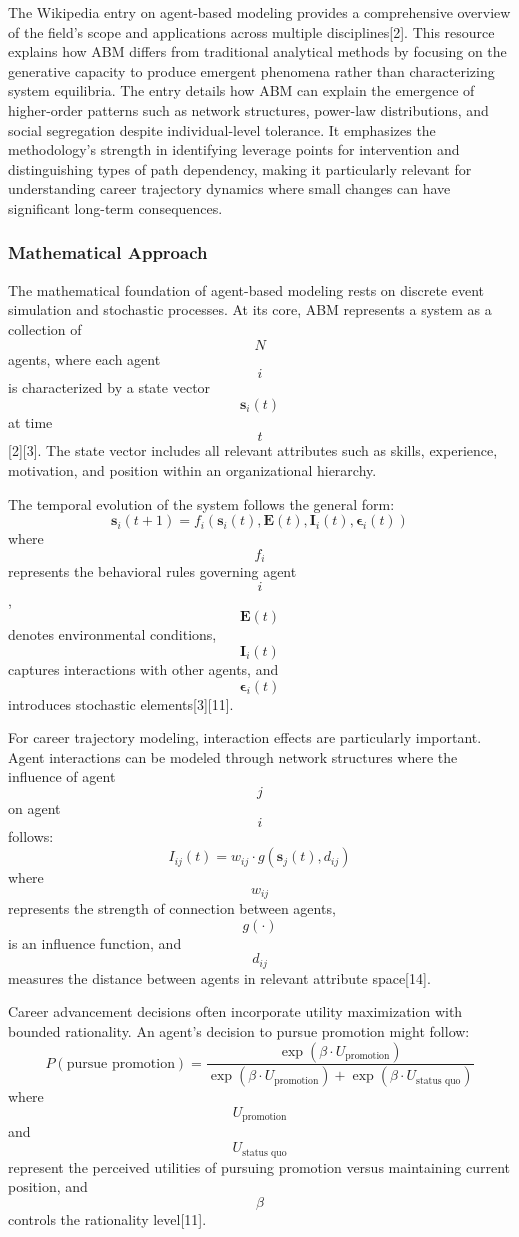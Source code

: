 \documentclass[main.tex]{subfiles}
\begin{document}
The Wikipedia entry on agent-based modeling provides a comprehensive overview of the field's scope and applications across multiple disciplines[2]. This resource explains how ABM differs from traditional analytical methods by focusing on the generative capacity to produce emergent phenomena rather than characterizing system equilibria. The entry details how ABM can explain the emergence of higher-order patterns such as network structures, power-law distributions, and social segregation despite individual-level tolerance. It emphasizes the methodology's strength in identifying leverage points for intervention and distinguishing types of path dependency, making it particularly relevant for understanding career trajectory dynamics where small changes can have significant long-term consequences.

\subsubsection{Mathematical Approach}

The mathematical foundation of agent-based modeling rests on discrete event simulation and stochastic processes. At its core, ABM represents a system as a collection of $$ N $$ agents, where each agent $$ i $$ is characterized by a state vector $$ \mathbf{s}_i(t) $$ at time $$ t $$[2][3]. The state vector includes all relevant attributes such as skills, experience, motivation, and position within an organizational hierarchy.

The temporal evolution of the system follows the general form:
$$
\mathbf{s}_i(t+1) = f_i(\mathbf{s}_i(t), \mathbf{E}(t), \mathbf{I}_i(t), \boldsymbol{\epsilon}_i(t))
$$
where $$ f_i $$ represents the behavioral rules governing agent $$ i $$, $$ \mathbf{E}(t) $$ denotes environmental conditions, $$ \mathbf{I}_i(t) $$ captures interactions with other agents, and $$ \boldsymbol{\epsilon}_i(t) $$ introduces stochastic elements[3][11].

For career trajectory modeling, interaction effects are particularly important. Agent interactions can be modeled through network structures where the influence of agent $$ j $$ on agent $$ i $$ follows:
$$
I_{ij}(t) = w_{ij} \cdot g(\mathbf{s}_j(t), d_{ij})
$$
where $$ w_{ij} $$ represents the strength of connection between agents, $$ g(\cdot) $$ is an influence function, and $$ d_{ij} $$ measures the distance between agents in relevant attribute space[14].

Career advancement decisions often incorporate utility maximization with bounded rationality. An agent's decision to pursue promotion might follow:
$$
P(\text{pursue promotion}) = \frac{\exp(\beta \cdot U_{\text{promotion}})}{\exp(\beta \cdot U_{\text{promotion}}) + \exp(\beta \cdot U_{\text{status quo}})}
$$
where $$ U_{\text{promotion}} $$ and $$ U_{\text{status quo}} $$ represent the perceived utilities of pursuing promotion versus maintaining current position, and $$ \beta $$ controls the rationality level[11].
\end{document}
